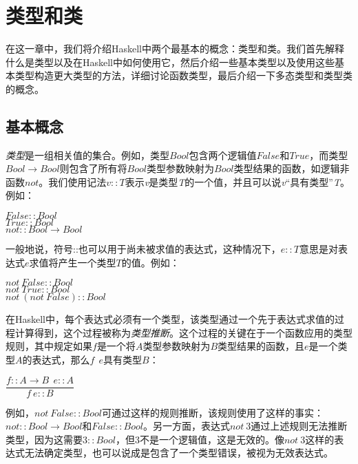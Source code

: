 \chapter{类型和类}
在这一章中，我们将介绍Haskell中两个最基本的概念：类型和类。我们首先解释什么是类型以及在Haskell中如何使用它，然后介绍一些基本类型以及使用这些基本类型构造更大类型的方法，详细讨论函数类型，最后介绍一下多态类型和类型类的概念。

\section{基本概念}
\textit{类型}是一组相关值的集合。例如，类型$Bool$包含两个逻辑值$False$和$True$，而类型$Bool
\rightarrow
Bool$则包含了所有将$Bool$类型参数映射为$Bool$类型结果的函数，如逻辑非函数$not$。我们使用记法$v::T$表示\textit{v}是类型\textit{T}的一个值，并且可以说\textit{v}“具有类型”\textit{T}。例如：

\noindent\hspace*{1cm} $False :: Bool$\\
\hspace*{1cm} $True :: Bool$\\
\hspace*{1cm} $not :: Bool \rightarrow Bool$

一般地说，符号::也可以用于尚未被求值的表达式，这种情况下，$e::T$意思是对表达式$e$求值将产生一个类型$T$的值。例如：

\noindent\hspace*{1cm} $not~False :: Bool$\\
\hspace*{1cm} $not~True :: Bool$\\
\hspace*{1cm} $not~(not~False):: Bool$

在Haskell中，每个表达式必须有一个类型，该类型通过一个先于表达式求值的过程计算得到，这个过程被称为\textit{类型推断}。这个过程的关键在于一个函数应用的类型规则，其中规定如果$f$是一个将$A$类型参数映射为$B$类型结果的函数，且$e$是一个类型$A$的表达式，那么$f~~e$具有类型$B$：\\

\begin{center}
$\dfrac{f::A \rightarrow B~~e::A}{f~e::B}$
\end{center}

例如，$not~False::Bool$可通过这样的规则推断，该规则使用了这样的事实：$not::Bool
\rightarrow
Bool$和$False::Bool$。另一方面，表达式$not~3$通过上述规则无法推断类型，因为这需要$3::Bool$，但$3$不是一个逻辑值，这是无效的。像$not~3$这样的表达式无法确定类型，也可以说成是包含了一个类型错误，被视为无效表达式。

